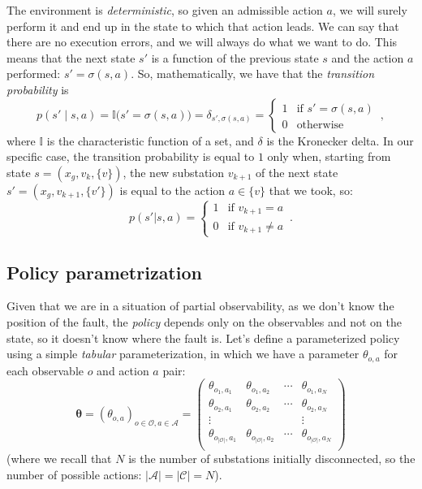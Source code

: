The environment is \emph{deterministic}, so given an admissible action $a$, we will surely perform it and end up in the state to which that action leads. We can say that there are no execution errors, and we will always do what we want to do. This means that the next state $s'$ is a function of the previous state $s$ and the action $a$ performed: $s' = \sigma(s,a)$. So, mathematically, we have that the \emph{transition probability} is
\begin{equation}
    p(s' \mid s, a) = \mathbb I\big(s' = \sigma(s, a)\big) = \delta_{s', \sigma(s,a)} = \begin{cases} 1 & \text{if } s'=\sigma(s,a) \\ 0 & \text{otherwise} \end{cases} \,,
\end{equation}
where $\mathbb I$ is the characteristic function of a set, and $\delta$ is the Kronecker delta. In our specific case, the transition probability is equal to $1$ only when, starting from state $s = (x_g, v_k, \{v\})$, the new substation $v_{k+1}$ of the next state $s' = (x_g, v_{k+1}, \{v'\})$ is equal to the action $a \in \{v\}$ that we took, so:
\begin{equation}
    p(s' | s,a) = \begin{cases}
        1 & \text{if } v_{k+1} = a \\
        0 & \text{if } v_{k+1} \neq a
    \end{cases} \,.
    \label{eq:transprob}
\end{equation}


\subsection{Policy parametrization}

Given that we are in a situation of partial observability, as we don't know the position of the fault, the \emph{policy} depends only on the observables and not on the state, so it doesn't know where the fault is. Let's define a parameterized policy using a simple \emph{tabular} parameterization, in which we have a parameter $\theta_{o,a}$ for each observable $o$ and action $a$ pair:
\begin{equation}
    \boldsymbol \theta = (\theta_{o,a})_{o \in \mathcal O, a \in \mathcal A} = \begin{pmatrix}
        \theta_{o_1, a_1} & \theta_{o_1, a_2} & \cdots & \theta_{o_1, a_N} \\
        \theta_{o_2, a_1} & \theta_{o_2, a_2} & \cdots & \theta_{o_2, a_N} \\
        \vdots            &                   &        & \vdots            \\
        \theta_{o_{|\mathcal O|}, a_1} & \theta_{o_{|\mathcal O|}, a_2}  & \cdots &  \theta_{o_{|\mathcal O|}, a_N} \\
    \end{pmatrix}
\end{equation}
(where we recall that $N$ is the number of substations initially disconnected, so the number of possible actions: $|\mathcal A| = |\mathcal C| = N$).

